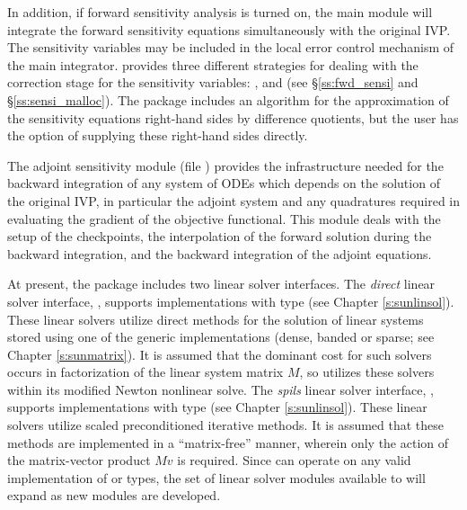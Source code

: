 In addition, if forward sensitivity analysis is turned on, the main module 
will integrate the forward sensitivity equations simultaneously with the original
IVP. The sensitivity variables may be included in the local error control
mechanism of the main integrator.
{\cvodes} provides three different strategies for dealing with the correction
stage for the sensitivity variables: ,  and
 (see \S\ref{ss:fwd_sensi} and \S\ref{ss:sensi_malloc}).
The {\cvodes} package includes an algorithm for the approximation of the
sensitivity equations right-hand sides by difference quotients, but the user has
the option of supplying these right-hand sides directly.

The adjoint sensitivity module (file ) provides the infrastructure needed for the 
backward integration of any system of ODEs which depends on the solution 
of the original IVP, in particular the adjoint system and any quadratures required
in evaluating the gradient of the objective functional.  This module deals with
the setup of the checkpoints, the interpolation of the forward solution during
the backward integration, and the backward integration of the adjoint equations.

At present, the package includes two linear solver interfaces.  The
{\em direct} linear solver interface, {\cvdls}, supports {\sunlinsol}
implementations with type  (see Chapter
\ref{s:sunlinsol}).  These linear solvers utilize direct methods for
the solution of linear systems stored using one of the {\sundials} generic
{\sunmatrix} implementations (dense, banded or sparse; see
Chapter \ref{s:sunmatrix}).  It is assumed that the dominant cost for
such solvers occurs in factorization of the linear system matrix $M$,
so {\cvode} utilizes these solvers within its modified Newton
nonlinear solve. 
The {\em spils} linear solver interface, {\cvspils}, supports
{\sunlinsol} implementations with type 
(see Chapter \ref{s:sunlinsol}).  These linear solvers utilize scaled
preconditioned iterative methods.  It is assumed that these methods
are implemented in a ``matrix-free'' manner, wherein only the action
of the matrix-vector product $Mv$ is required.  Since {\cvode} can
operate on any valid {\sunlinsol} implementation of
 or  types, the set of
linear solver modules available to {\cvodes} will expand as new
{\sunlinsol} modules are developed.

